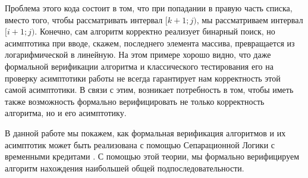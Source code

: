 Проблема этого кода состоит в том, что при попадании в правую часть списка, вместо того, чтобы рассматривать интервал $[k+1;j)$, мы
рассматриваем интервал \\
$[i+1;j)$. Конечно, сам алгоритм корректно реализует бинарный поиск, но асимптотика при вводе, скажем, 
последнего элемента массива, превращается из логарифмической в линейную. На этом примере хорошо видно, что даже формальной верификации
алгоритма и классического тестирования его на проверку асимптотики работы не всегда гарантирует нам корректность этой самой асимптотики. 
В связи с этим, возникает потребность в том, чтобы иметь также возможность формально верифицировать не только корректность алгоритма, но
и его асимптотику. 
\par
В данной работе мы покажем, как формальная верификация алгоритмов и их асимптотик может быть реализована с помощью Сепарационной Логики
с временными кредитами \cite{base_article}. С помощью этой теории, мы формально верифицируем алгоритм нахождения наибольшей общей подпоследовательности. 